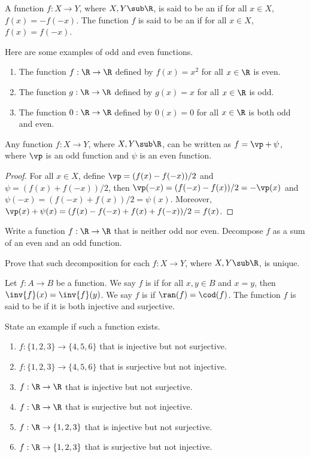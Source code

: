 \documentclass[10pt]{article}
\begin{document}
\begin{definition}
    A function $f:X\to Y$, where $X,Y\sub\R$, is said to be an  if for all $x\in X$, $f(x)=-f(-x)$. The function $f$ is said to be an  if for all $x\in X$, $f(x)=f(-x)$. 
\end{definition}
\begin{example}
    Here are some examples of odd and even functions.
    \begin{enumerate}
        \item The function $f:\R\to\R$ defined by $f(x)={x}^{2}$ for all $x\in\R$ is even.
        \item The function $g:\R\to\R$ defined by $g(x)=x$ for all $x\in\R$ is odd.
        \item The function $0:\R\to\R$ defined by $0(x)=0$ for all $x\in\R$ is both odd and even.
    \end{enumerate}
\end{example}
\begin{proposition}
    Any function $f:X\to Y$, where $X,Y\sub\R$, can be written as $f=\vp+\psi$, where $\vp$ is an odd function and $\psi$ is an even function.
\end{proposition}
\begin{proof}
    For all $x\in X$, define $\vp=(f(x)-f(-x))/2$ and $\psi=(f(x)+f(-x))/2$, then $\vp(-x)=(f(-x)-f(x))/2=-\vp(x)$ and $\psi(-x)=(f(-x)+f(x))/2=\psi(x)$. Moreover, $\vp(x)+\psi(x)=(f(x)-f(-x)+f(x)+f(-x))/2=f(x)$.
\end{proof}
\begin{problem}
    Write a function $f:\R\to\R$ that is neither odd nor even. Decompose $f$ as a sum of an even and an odd function.
\end{problem}
\begin{problem}
    Prove that such decomposition for each $f:X\to Y$, where $X,Y\sub\R$, is unique.
\end{problem}
\begin{definition}
    Let $f:A\to B$ be a function. We say $f$ is  if for all $x,y\in B$ and $x=y$, then $\inv{f}(x)=\inv{f}(y)$. We say $f$ is  if $\ran(f)=\cod(f)$. The function $f$ is said to be  if it is both injective and surjective.
\end{definition}
\begin{problem}
    State an example if such a function exists.
    \begin{enumerate}
        \item $f:\{1,2,3\}\to\{4,5,6\}$ that is injective but not surjective.
        \item $f:\{1,2,3\}\to\{4,5,6\}$ that is surjective but not injective.
        \item $f:\R\to\R$ that is injective but not surjective.
        \item $f:\R\to\R$ that is surjective but not injective.
        \item $f:\R\to\{1,2,3\}$ that is injective but not surjective.
        \item $f:\R\to\{1,2,3\}$ that is surjective but not injective.
    \end{enumerate}
\end{problem}
\end{document}
